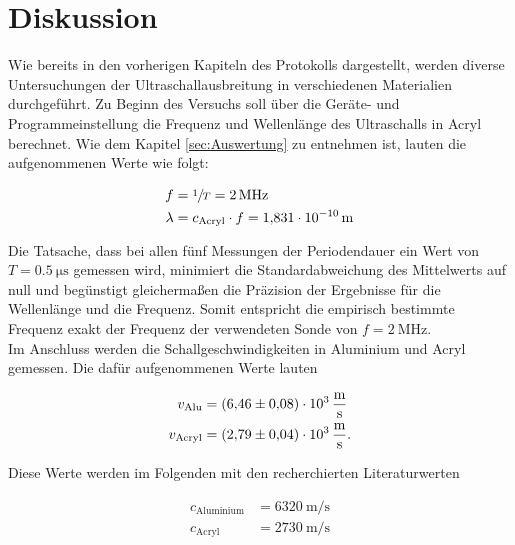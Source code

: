 %

%
\section{Diskussion}
\label{sec:Diskussion}

Wie bereits in den vorherigen Kapiteln des Protokolls dargestellt, werden diverse Untersuchungen der Ultraschallausbreitung 
in verschiedenen Materialien durchgeführt. Zu Beginn des Versuchs soll über die Geräte- und Programmeinstellung die Frequenz 
und Wellenlänge des Ultraschalls in Acryl berechnet. Wie dem Kapitel \ref{sec:Auswertung} zu entnehmen ist, lauten die 
aufgenommenen Werte wie folgt:

\begin{align*}
    f &= \sfrac{1}{T} = \qty{2}{\mega\hertz}\\
    \lambda &= c_\text{Acryl}\cdot{}f = \qty{1.831e-10}{\meter}
\end{align*}

\noindent Die Tatsache, dass bei allen fünf Messungen der Periodendauer ein Wert von $T = \qty{0.5}{\micro\second}$ gemessen 
wird, minimiert die Standardabweichung des Mittelwerts auf null und begünstigt gleichermaßen die Präzision der Ergebnisse 
für die Wellenlänge und die Frequenz. Somit entspricht die empirisch bestimmte Frequenz exakt der Frequenz der verwendeten 
Sonde von $f = \qty{2}{\mega\hertz}$.\\

\noindent Im Anschluss werden die Schallgeschwindigkeiten in Aluminium und Acryl gemessen. Die dafür aufgenommenen Werte lauten 

\begin{align*}
    v_\text{Alu} &= \qty{6.46\pm0.08e3}{\meter\per\second} \\
    v_\text{Acryl} &= \qty{2.79\pm0.04e3}{\meter \per \second}.
\end{align*}

\noindent Diese Werte werden im Folgenden mit den recherchierten Literaturwerten

\begin{align*}
    c_\text{Aluminium} &= \qty{6320}{\meter \per \second}\\
    c_\text{Acryl}  &= \qty{2730}{\meter \per \second}
\end{align*}

